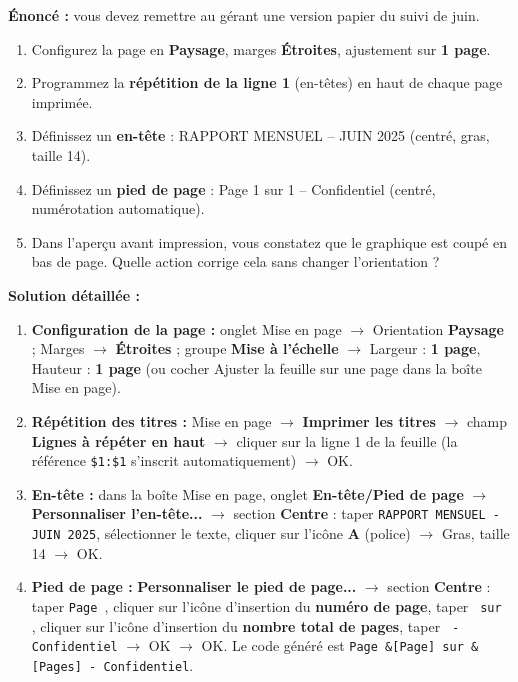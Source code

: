 \documentclass[11pt]{article}
\begin{document}
\begin{exoresolu}
\textbf{Énoncé :} vous devez remettre au gérant une version papier du suivi de juin.
\begin{enumerate}
    \item Configurez la page en \textbf{Paysage}, marges \textbf{Étroites}, ajustement sur \textbf{1 page}.
    \item Programmez la \textbf{répétition de la ligne 1} (en-têtes) en haut de chaque page imprimée.
    \item Définissez un \textbf{en-tête} : \og{}RAPPORT MENSUEL -- JUIN 2025\fg{} (centré, gras, taille 14).
    \item Définissez un \textbf{pied de page} : \og{}Page 1 sur 1 -- Confidentiel\fg{} (centré, numérotation automatique).
    \item Dans l'aperçu avant impression, vous constatez que le graphique est coupé en bas de page. Quelle action corrige cela sans changer l'orientation ?
\end{enumerate}
\tcblower
\textbf{Solution détaillée :}
\begin{enumerate}
    \item \textbf{Configuration de la page :} onglet Mise en page $\rightarrow$ Orientation \textbf{Paysage} ; Marges $\rightarrow$ \textbf{Étroites} ; groupe \textbf{Mise à l'échelle} $\rightarrow$ Largeur : \textbf{1 page}, Hauteur : \textbf{1 page} (ou cocher \og{}Ajuster la feuille sur une page\fg{} dans la boîte Mise en page).
    \item \textbf{Répétition des titres :} Mise en page $\rightarrow$ \textbf{Imprimer les titres} $\rightarrow$ champ \textbf{Lignes à répéter en haut} $\rightarrow$ cliquer sur la ligne 1 de la feuille (la référence \texttt{\$1:\$1} s'inscrit automatiquement) $\rightarrow$ OK.
    \item \textbf{En-tête :} dans la boîte \og{}Mise en page\fg{}, onglet \textbf{En-tête/Pied de page} $\rightarrow$ \textbf{Personnaliser l'en-tête...} $\rightarrow$ section \textbf{Centre} : taper \texttt{RAPPORT MENSUEL - JUIN 2025}, sélectionner le texte, cliquer sur l'icône \textbf{A} (police) $\rightarrow$ Gras, taille 14 $\rightarrow$ OK.
    \item \textbf{Pied de page :} \textbf{Personnaliser le pied de page...} $\rightarrow$ section \textbf{Centre} : taper \texttt{Page }, cliquer sur l'icône d'insertion du \textbf{numéro de page}, taper \texttt{ sur }, cliquer sur l'icône d'insertion du \textbf{nombre total de pages}, taper \texttt{ - Confidentiel} $\rightarrow$ OK $\rightarrow$ OK. Le code généré est \texttt{Page \&[Page] sur \&[Pages] - Confidentiel}.

\end{enumerate}
\end{exoresolu}
\end{document}
